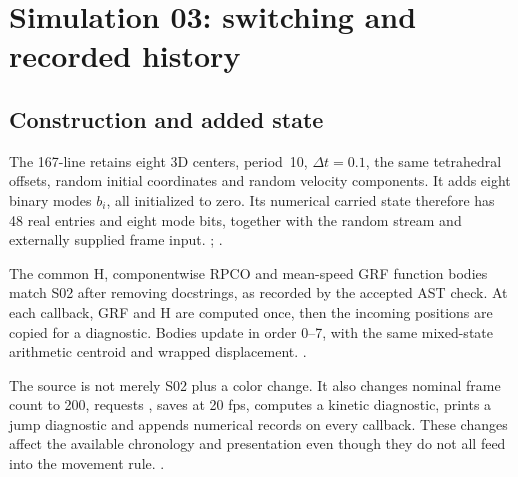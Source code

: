 \chapter{Simulation 03: switching and recorded history}\label{ch:s03}

\section{Construction and added state}
The 167-line  retains eight 3D centers, period~10,
$\Delta t=0.1$, the same tetrahedral offsets, random initial coordinates
and random velocity components. It adds eight binary modes $b_i$, all
initialized to zero. Its numerical carried state therefore has 48 real
entries and eight mode bits, together with the random stream and externally
supplied frame input. ; \cite{study03}.

The common H, componentwise RPCO and mean-speed GRF function bodies match
S02 after removing docstrings, as recorded by the accepted AST check.
At each callback, GRF and H are computed once, then the incoming positions
are copied for a diagnostic. Bodies update in order 0--7, with the same
mixed-state arithmetic centroid and wrapped displacement.
. 

The source is not merely S02 plus a color change. It also changes nominal
frame count to 200, requests , saves at 20 fps,
computes a kinetic diagnostic, prints a jump diagnostic and appends
numerical records on every callback. These changes affect the available
chronology and presentation even though they do not all feed into the
movement rule. . 

